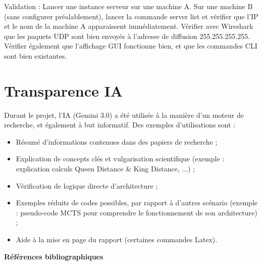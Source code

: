 \documentclass[11pt,a4paper,titlepage,oneside]{article}
\begin{document}
    Validation : Lancer une instance serveur sur une machine A. Sur une machine B (sans configurer préalablement), lancer la commande server list et vérifier que l'IP et le nom de la machine A apparaissent immédiatement. Vérifier avec Wireshark que les paquets UDP sont bien envoyés à l'adresse de diffusion 255.255.255.255. Vérifier également que l'affichage GUI fonctionne bien, et que les commandes CLI sont bien existantes.
    
    \section{Transparence IA}

    Durant le projet, l'IA (Gemini 3.0) a été utilisée à la manière d'un moteur de recherche, et également à but informatif. Des exemples d'utilisations sont :
    \begin{itemize}
        \item Résumé d'informations contenues dans des papiers de recherche ;
        \item Explication de concepts clés et vulgarisation scientifique (exemple : explication calculs Queen Distance \& King Distance, ...) ;
        \item Vérification de logique directe d'architecture ;
        \item Exemples réduits de codes possibles, par rapport à d'autres scénario (exemple : pseudo-code MCTS pour comprendre le fonctionnement de son architecture) ;
        \item Aide à la mise en page du rapport (certaines commandes Latex).
    \end{itemize}
    
    \newpage
    \markboth{}{} 
    
    
    \begin{flushleft}
        \huge\bfseries Références bibliographiques
    \end{flushleft}
    \vspace{1.5cm} %

    \nocite{*} 
    \printbibliography[heading=none]

    \appendix
\end{document}
